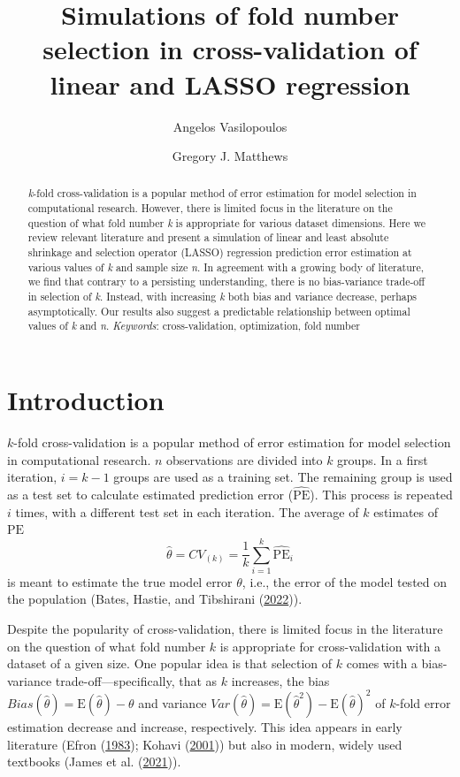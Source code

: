 \documentclass[
  12pt,
]{article}
\title{Simulations of fold number selection in cross-validation of
linear and LASSO regression}
\author{Angelos Vasilopoulos \and Gregory J. Matthews}
\date{}
\begin{document}
\maketitle
\begin{abstract}
\emph{k}-fold cross-validation is a popular method of error estimation
for model selection in computational research. However, there is limited
focus in the literature on the question of what fold number \emph{k} is
appropriate for various dataset dimensions. Here we review relevant
literature and present a simulation of linear and least absolute
shrinkage and selection operator (LASSO) regression prediction error
estimation at various values of \emph{k} and sample size \emph{n}. In
agreement with a growing body of literature, we find that contrary to a
persisting understanding, there is no bias-variance trade-off in
selection of \emph{k}. Instead, with increasing \emph{k} both bias and
variance decrease, perhaps asymptotically. Our results also suggest a
predictable relationship between optimal values of \emph{k} and
\emph{n}. \textbar{} \emph{Keywords}: cross-validation, optimization,
fold number
\end{abstract}

\hypertarget{sec:intro}{%
\section{Introduction}\label{sec:intro}}

\(k\)-fold cross-validation is a popular method of error estimation for
model selection in computational research. \(n\) observations are
divided into \(k\) groups. In a first iteration, \(i = k - 1\) groups
are used as a training set. The remaining group is used as a test set to
calculate estimated prediction error (\(\mathrm{\widehat{PE}}\)). This
process is repeated \(i\) times, with a different test set in each
iteration. The average of \(k\) estimates of \(\mathrm{PE}\)
\[\hat{\theta} = CV_{(k)} = \frac{1}{k}\sum_{i=1}^{k}\mathrm{\widehat{PE}}_i\]
is meant to estimate the true model error \(\theta\), i.e., the error of
the model tested on the population (Bates, Hastie, and Tibshirani
(\protect\hyperlink{ref-Bates2022}{2022})).

Despite the popularity of cross-validation, there is limited focus in
the literature on the question of what fold number \(k\) is appropriate
for cross-validation with a dataset of a given size. One popular idea is
that selection of \(k\) comes with a bias-variance
trade-off---specifically, that as \(k\) increases, the bias
\(Bias(\hat{\theta}) = \mathrm{E}(\hat{\theta}) - \theta\) and variance
\(Var(\hat{\theta}) = \mathrm{E}(\hat{\theta}^2) - \mathrm{E}(\hat{\theta})^2\)
of \(k\)-fold error estimation decrease and increase, respectively. This
idea appears in early literature (Efron
(\protect\hyperlink{ref-Efron1983}{1983}); Kohavi
(\protect\hyperlink{ref-Kohavi2001}{2001})) but also in modern, widely
used textbooks (James et al. (\protect\hyperlink{ref-James2021}{2021})).
\end{document}
